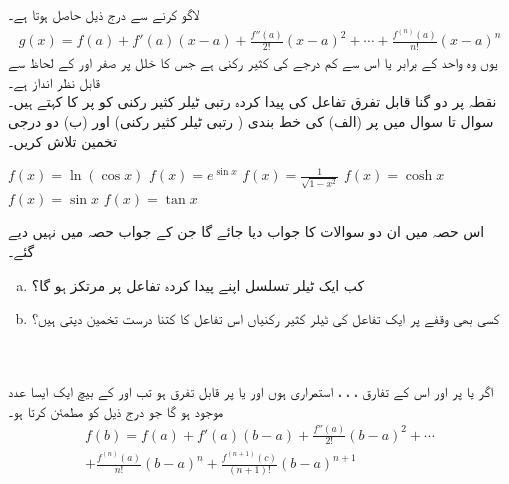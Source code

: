  لاگو کرنے سے درج ذیل حاصل ہوتا ہے۔
\begin{align*}
g(x)=f(a)+f'(a)(x-a)+\frac{f''(a)}{2!}(x-a)^2+\cdots+\frac{f^{(n)}(a)}{n!}(x-a)^n
\end{align*}
یوں  وہ واحد  کے برابر یا اس سے کم درجے  کی کثیر رکنی ہے جس کا خلل  پر صفر اور  کے لحاظ سے قابل نظر انداز ہے۔ 
\\
نقطہ  پر دو گنا قابل تفرق تفاعل  کی پیدا کردہ  رتبی ٹیلر کثیر رکنی کو  پر  کا  کہتے ہیں۔ سوال  تا سوال  میں  پر  (الف)  کی خط بندی ( رتبی ٹیلر کثیر رکنی) اور (ب) دو درجی تخمین تلاش کریں۔

$f(x)=\ln(\cos x)$
$f(x)=e^{\sin x}$
$f(x)=\frac{1}{\sqrt{1-x^2}}$
$f(x)=\cosh x$
$f(x)=\sin x$
$f(x)=\tan x$





اس حصہ میں ان دو سوالات کا جواب دیا جائے گا جن کے جواب حصہ  میں نہیں دیے گئے۔
\begin{enumerate}[a.]
\item
کب ایک ٹیلر تسلسل اپنے پیدا کردہ تفاعل پر مرتکز ہو گا؟
\item
کسی بھی وقفے  پر ایک تفاعل کی ٹیلر کثیر رکنیاں اس تفاعل کا کتنا درست تخمین دیتی ہیں؟
\end{enumerate}

\\
\\
اگر  یا  پر  اور اس کے  تفارق ، ، ،  استمراری ہوں اور  یا  پر  قابل تفرق ہو تب  اور  کے بیچ ایک ایسا عدد  موجود ہو گا جو درج ذیل کو مطمئن کرتا ہو۔
\begin{multline*}
f(b)=f(a)+f'(a)(b-a)+\frac{f''(a)}{2!}(b-a)^2+\cdots\\
+\frac{f^{(n)}(a)}{n!}(b-a)^n+\frac{f^{(n+1)}(c)}{(n+1)!}(b-a)^{n+1}
\end{multline*}

